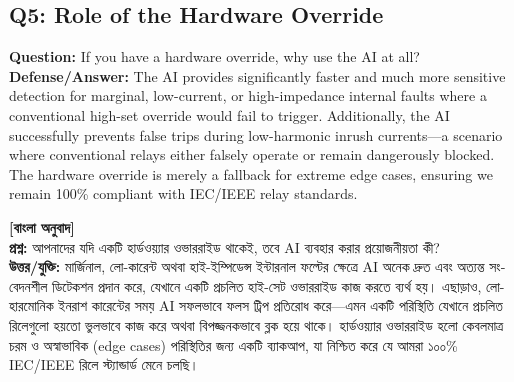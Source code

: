 \documentclass[12pt]{article}
\begin{document}
\subsection*{Q5: Role of the Hardware Override}
\textbf{Question:} If you have a hardware override, why use the AI at all? \\
\textbf{Defense/Answer:} The AI provides significantly faster and much more sensitive detection for marginal, low-current, or high-impedance internal faults where a conventional high-set override would fail to trigger. Additionally, the AI successfully prevents false trips during low-harmonic inrush currents—a scenario where conventional relays either falsely operate or remain dangerously blocked. The hardware override is merely a fallback for extreme edge cases, ensuring we remain 100\% compliant with IEC/IEEE relay standards.

\begin{bengali}
\textbf{[বাংলা অনুবাদ]} \\
\textbf{প্রশ্ন:} আপনাদের যদি একটি হার্ডওয়্যার ওভাররাইড থাকেই, তবে AI ব্যবহার করার প্রয়োজনীয়তা কী? \\
\textbf{উত্তর/যুক্তি:} মার্জিনাল, লো-কারেন্ট অথবা হাই-ইম্পিডেন্স ইন্টারনাল ফল্টের ক্ষেত্রে AI অনেক দ্রুত এবং অত্যন্ত সংবেদনশীল ডিটেকশন প্রদান করে, যেখানে একটি প্রচলিত হাই-সেট ওভাররাইড কাজ করতে ব্যর্থ হয়। এছাড়াও, লো-হারমোনিক ইনরাশ কারেন্টের সময় AI সফলভাবে ফলস ট্রিপ প্রতিরোধ করে—এমন একটি পরিস্থিতি যেখানে প্রচলিত রিলেগুলো হয়তো ভুলভাবে কাজ করে অথবা বিপজ্জনকভাবে ব্লক হয়ে থাকে। হার্ডওয়্যার ওভাররাইড হলো কেবলমাত্র চরম ও অস্বাভাবিক (edge cases) পরিস্থিতির জন্য একটি ব্যাকআপ, যা নিশ্চিত করে যে আমরা ১০০\% IEC/IEEE রিলে স্ট্যান্ডার্ড মেনে চলছি।
\end{bengali}
\end{document}
